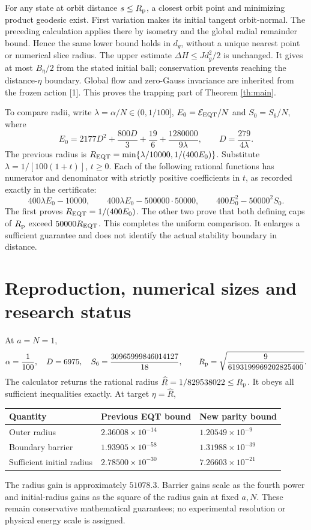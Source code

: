 \documentclass[11pt,a4paper]{article}
\begin{document}
For any state at orbit distance $s\le R_{\rm p}$, a closest orbit point and minimizing product geodesic exist. First variation makes its initial tangent orbit-normal. The preceding calculation applies there by isometry and the global radial remainder bound. Hence the same lower bound holds in $d_g$, without a unique nearest point or numerical slice radius. The upper estimate $\Delta H\le Jd_g^2/2$ is unchanged. It gives at most $B_\eta/2$ from the stated initial ball; conservation prevents reaching the distance-$\eta$ boundary. Global flow and zero-Gauss invariance are inherited from the frozen action [1]. This proves the trapping part of Theorem \ref{th:main}.

To compare radii, write $\lambda=\alpha/N\in(0,1/100]$, $E_0=\mathcal E_{\rm EQT}/N$ and $S_0=S_6/N$, where
\[
E_0=2177D^2+\frac{800D}{3}+\frac{19}{6}+\frac{1280000}{9\lambda},
\qquad D=\frac{279}{4\lambda}.
\]
The previous radius is $R_{\rm EQT}=\min\{\lambda/10000,1/(400E_0)\}$. Substitute $\lambda=1/[100(1+t)]$, $t\ge0$. Each of the following rational functions has numerator and denominator with strictly positive coefficients in $t$, as recorded exactly in the certificate:
\[
400\lambda E_0-10000,\qquad
400\lambda E_0-500000\cdot50000,\qquad
400E_0^2-50000^2S_0.
\]
The first proves $R_{\rm EQT}=1/(400E_0)$. The other two prove that both defining caps of $R_{\rm p}$ exceed $50000R_{\rm EQT}$. This completes the uniform comparison. It enlarges a sufficient guarantee and does not identify the actual stability boundary in distance.
\newpage
\section{Reproduction, numerical sizes and research status}
At $a=N=1$,
\[
\alpha=\frac1{100},\quad D=6975,\quad
S_6=\frac{30965999846014127}{18},\qquad
R_{\rm p}=\sqrt{\frac9{6193199969202825400}}.
\]
The calculator returns the rational radius $\widehat R=1/829538022\le R_{\rm p}$. It obeys all sufficient inequalities exactly. At target $\eta=\widehat R$,
\begin{center}
\begin{tabular}{lll}\toprule
Quantity & Previous EQT bound & New parity bound\\\midrule
Outer radius & $2.36008\times10^{-14}$ & $1.20549\times10^{-9}$\\
Boundary barrier & $1.93905\times10^{-58}$ & $1.31988\times10^{-39}$\\
Sufficient initial radius & $2.78500\times10^{-30}$ & $7.26603\times10^{-21}$\\\bottomrule
\end{tabular}
\end{center}
The radius gain is approximately $51078.3$. Barrier gains scale as the fourth power and initial-radius gains as the square of the radius gain at fixed $a,N$. These remain conservative mathematical guarantees; no experimental resolution or physical energy scale is assigned.
\end{document}

